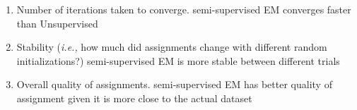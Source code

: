 \begin{answer}

\begin{enumerate}[label=\roman*.]
    \item Number of iterations taken to converge. semi-supervised EM converges faster than Unsupervised 
    \item Stability (\emph{i.e.,} how much did assignments change with different random initializations?)
    semi-supervised EM is more stable between different trials
    \item Overall quality of assignments. semi-supervised EM has better quality of assignment given it is more close to the actual dataset
\end{enumerate}

\end{answer}
